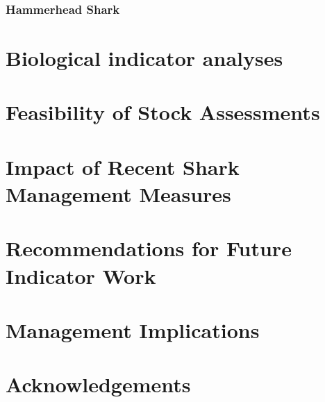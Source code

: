 \documentclass[12pt,draft]{article}
\begin{document}
     \subsubsection{Hammerhead Shark}
          
      
   
 \clearpage     
      
      
      
      
     
      
\section{Biological indicator analyses}
     
      
         
      
\section{Feasibility of Stock Assessments}
\section{Impact of Recent Shark Management Measures}

\section{Recommendations for Future Indicator Work}
\section{Management Implications}

\section*{Acknowledgements}
\end{document}

